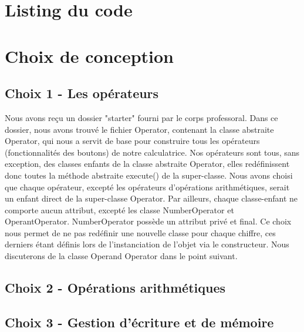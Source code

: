 \documentclass[12pt]{report}
\begin{document}
    \section*{Listing du code}
    \section*{Choix de conception}
        \subsection*{Choix 1 - Les opérateurs}
            Nous avons reçu un dossier "starter" fourni par le corps professoral. Dans ce dossier, nous avons trouvé le
    fichier Operator, contenant la classe abstraite Operator, qui nous a servit de base pour construire tous les opérateurs (fonctionnalités des boutons) de notre
    calculatrice.
    \newline Nos opérateurs sont tous, sans exception, des classes enfants de la classe abstraite Operator, elles redéfinissent
    donc toutes la méthode abstraite execute() de la super-classe.
    Nous avons choisi que chaque opérateur, excepté les opérateurs d'opérations arithmétiques, serait un enfant direct de la
    super-classe Operator.
    \newline
    Par ailleurs, chaque classe-enfant ne comporte aucun attribut, excepté les classe NumberOperator et OperantOperator.
   NumberOperator possède un attribut privé et final. Ce choix nous permet de ne pas redéfinir une nouvelle classe pour chaque
    chiffre, ces derniers étant définis lors de l'instanciation de l'objet via le constructeur.
    \newline Nous discuterons de la classe Operand Operator dans le point suivant.

        \subsection*{Choix 2 - Opérations arithmétiques}

        \subsection*{Choix 3 - Gestion d'écriture et de mémoire}
\end{document}
